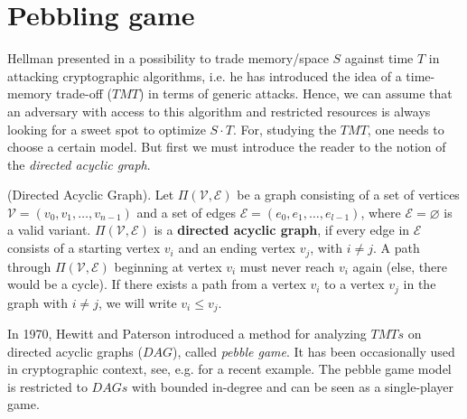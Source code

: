 \section{Pebbling game}
Hellman presented in \cite{Hellman:2006:CTT:2263346.2269686} a possibility to trade memory/space $S$ against time $T$ in attacking cryptographic algorithms, i.e. he has introduced the idea of a time-memory trade-off ($TMT$) in terms of generic attacks. Hence, we can assume that an adversary with access to this algorithm and restricted resources is always looking for a sweet spot to optimize $S \cdot T$. For, studying the $TMT$, one needs to choose a certain model. But first we must introduce the reader to the notion of the \textit{directed acyclic graph}.

\begin{definition}{(Directed Acyclic Graph).}\textnormal{\cite{ForlerLW13}}
  Let $\Pi(\mathcal{V},\mathcal{E})$ be a graph consisting of a set of vertices $\mathcal{V}=(v_0,v_1,\dots,v_{n-1})$ and a set of edges $\mathcal{E}=(e_0,e_1,\dots,e_{l-1})$, where $\mathcal{E}=\varnothing$ is a valid variant. $\Pi(\mathcal{V},\mathcal{E})$ is a \textbf{directed acyclic graph}, if every edge in $\mathcal{E}$
  consists of a starting vertex $v_i$ and an ending vertex $v_j$, with $i \neq j$. A path through $\Pi(\mathcal{V},\mathcal{E})$ beginning at vertex $v_i$ must never reach $v_i$ again (else, there would be a cycle). If there exists a path from a vertex $v_i$ to a vertex $v_j$ in the graph with $i \neq j$, we will write $v_i \leq v_j$.
\end{definition}

In 1970, Hewitt and Paterson introduced a method for analyzing $TMTs$ on directed acyclic graphs ($DAG$), called \textit{pebble game}. It has been occasionally used in cryptographic context, see, e.g. \cite{Dziembowski:2011:KSR:2033036.2033061} for a recent example. The pebble game model is restricted to $DAGs$ with bounded in-degree and can be seen as a single-player game.

